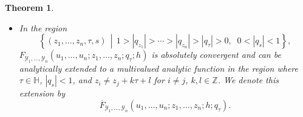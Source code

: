 \documentclass[9pt]{amsart}
\newtheorem{theorem}{Theorem}[section]
\begin{document}
\begin{theorem}
\begin{itemize}
\begin{align}\label{98}
\begin{split}
    \left(q_s \frac{\partial}{\partial q_s}\right)^m f
    + \sum_{p=1}^{m} c_{p,i}(z_1, \dots, z_n; q; h)
    \left(q_s \frac{\partial}{\partial q_s}\right)^{m-p} f = 0,
\end{split}
\end{align}
for $i = 1, \dots, n$, in the region $1 > |q_{z_1}| > \cdots > |q_{z_n}| > |q| > 0$, $0 < |q_s| < 1$.

\item In the region
\[
\left\{(z_1, \dots, z_n, \tau, s) \,\middle|\,
1 > |q_{z_1}| > \cdots > |q_{z_n}| > |q_{\tau}| > 0,\;\; 0 < |q_s| < 1 \right\},
\]
$F_{\mathcal{Y}_{1}, \dots, \mathcal{Y}_{n}}(u_1, \dots, u_n; z_1, \dots, z_n; q_\tau; h)$ is absolutely convergent and can be analytically extended to a multivalued analytic function in the region where $\tau \in \mathbb{H}$, $|q_s| < 1$, and $z_i \neq z_j + k \tau + l$ for $i \neq j$, $k, l \in \mathbb{Z}$. We denote this extension by
\[
\overline{F}_{\mathcal{Y}_{1}, \dots, \mathcal{Y}_{n}}(u_1, \dots, u_n; z_1, \dots, z_n; h; q_\tau).
\]
\end{itemize}
\end{theorem}
\end{document}

